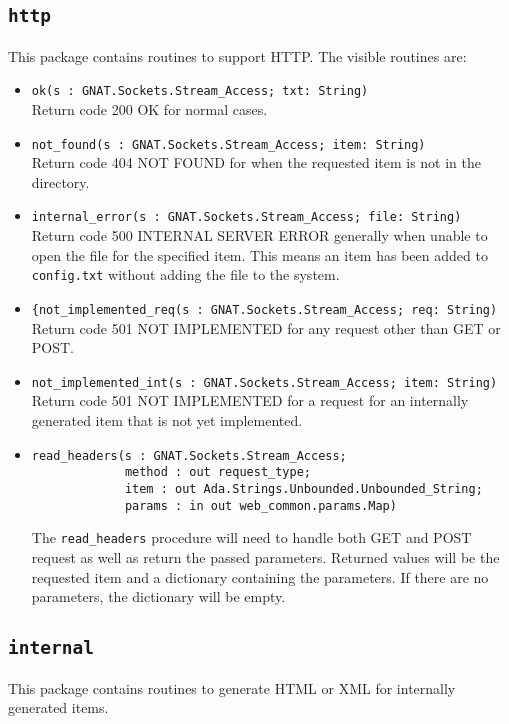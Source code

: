 \documentclass[10pt, openany, draft]{article}
\begin{document}
\subsection{\texttt{http}}
This package contains routines to support HTTP.  The visible routines are:
\begin{itemize}
  \item \verb|ok(s : GNAT.Sockets.Stream_Access; txt: String)|\\
  Return code 200 OK for normal cases.
  \item \verb|not_found(s : GNAT.Sockets.Stream_Access; item: String)|\\
  Return code 404 NOT FOUND for when the requested item is not in the directory.
  \item \verb|internal_error(s : GNAT.Sockets.Stream_Access; file: String)|\\
  Return code 500 INTERNAL SERVER ERROR generally when unable to open the file for the specified item.  This means an item has been added to \texttt{config.txt} without adding the file to the system.
  \item \verb|{not_implemented_req(s : GNAT.Sockets.Stream_Access; req: String)|\\
  Return code 501 NOT IMPLEMENTED for any request other than GET or POST.
  \item \verb|not_implemented_int(s : GNAT.Sockets.Stream_Access; item: String)|\\
  Return code 501 NOT IMPLEMENTED for a request for an internally generated item that is not yet implemented.
  \item \begin{verbatim}read_headers(s : GNAT.Sockets.Stream_Access;
             method : out request_type;
             item : out Ada.Strings.Unbounded.Unbounded_String;
             params : in out web_common.params.Map)
            \end{verbatim}
   The \texttt{read\_headers} procedure will need to handle both GET and POST request as well as return the passed parameters.  Returned values will be the requested item and a dictionary containing the parameters.  If there are no parameters, the dictionary will be empty.
\end{itemize}

\subsection{\texttt{internal}}
This package contains routines to generate HTML or XML for internally generated items.
\end{document}
